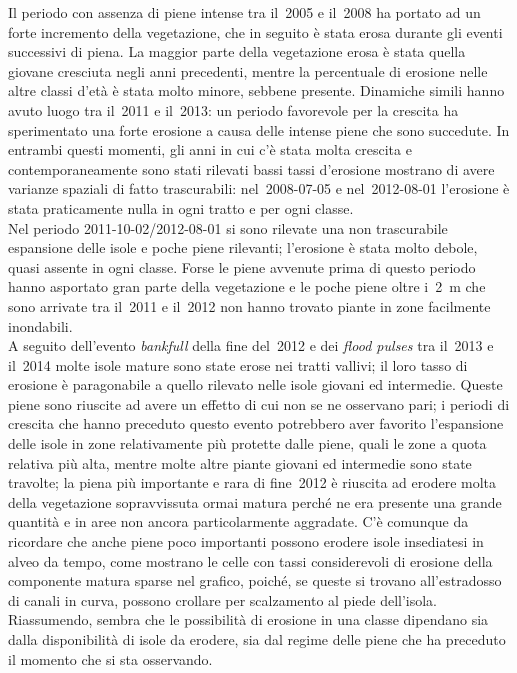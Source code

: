Il periodo con assenza di piene intense tra il~2005 e il~2008 ha portato ad un forte incremento della vegetazione, che in seguito è stata erosa durante gli eventi successivi di piena.
La maggior parte della vegetazione erosa è stata quella giovane cresciuta negli anni precedenti, mentre la percentuale di erosione nelle altre classi d'età è stata molto minore, sebbene presente.
Dinamiche simili hanno avuto luogo tra il~2011 e il~2013: un periodo favorevole per la crescita ha sperimentato una forte erosione a causa delle intense piene che sono succedute.
In entrambi questi momenti, gli anni in cui c'è stata molta crescita e contemporaneamente sono stati rilevati bassi tassi d'erosione mostrano di avere varianze spaziali di fatto trascurabili: nel~2008-07-05 e nel~2012-08-01 l'erosione è stata praticamente nulla in ogni tratto e per ogni classe.
\\
Nel periodo 2011-10-02/2012-08-01 si sono rilevate una non trascurabile espansione delle isole e poche piene rilevanti; l'erosione è stata molto debole, quasi assente in ogni classe. Forse le piene avvenute prima di questo periodo hanno asportato gran parte della vegetazione e le poche piene oltre i~\SI{2}{\m} che sono arrivate tra il~2011 e il~2012 non hanno trovato piante in zone facilmente inondabili.
\\
A seguito dell'evento \emph{bankfull} della fine del~2012 e dei \emph{flood pulses} tra il~2013 e il~2014 molte isole mature sono state erose nei tratti vallivi; il loro tasso di erosione è paragonabile a quello rilevato nelle isole giovani ed intermedie. Queste piene sono riuscite ad avere un effetto di cui non se ne osservano pari; i periodi di crescita che hanno preceduto questo evento potrebbero aver favorito l'espansione delle isole in zone relativamente più protette dalle piene, quali le zone a quota relativa più alta, mentre molte altre piante giovani ed intermedie sono state travolte; la piena più importante e rara di fine~2012 è riuscita ad erodere molta della vegetazione sopravvissuta ormai matura perché ne era presente una grande quantità e in aree non ancora particolarmente aggradate.
C'è comunque da ricordare che anche piene poco importanti possono erodere isole insediatesi in alveo da tempo, come mostrano le celle con tassi considerevoli di erosione della componente matura sparse nel grafico, poiché, se queste si trovano all'estradosso di canali in curva, possono crollare per scalzamento al piede dell'isola.
\\
Riassumendo, sembra che le possibilità di erosione in una classe dipendano sia dalla disponibilità di isole da erodere, sia dal regime delle piene che ha preceduto il momento che si sta osservando.

